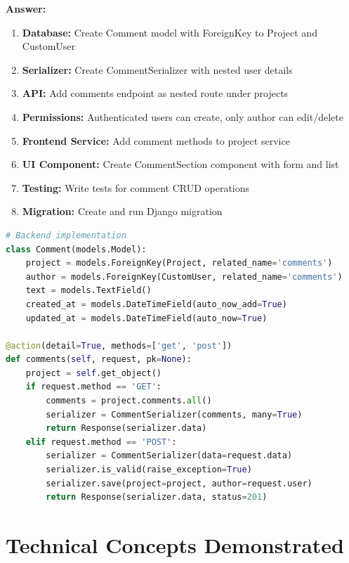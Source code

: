 \documentclass[11pt,a4paper]{article}
\begin{document}
\textbf{Answer:}
\begin{enumerate}[leftmargin=*]
    \item \textbf{Database:} Create Comment model with ForeignKey to Project and CustomUser
    \item \textbf{Serializer:} Create CommentSerializer with nested user details
    \item \textbf{API:} Add comments endpoint as nested route under projects
    \item \textbf{Permissions:} Authenticated users can create, only author can edit/delete
    \item \textbf{Frontend Service:} Add comment methods to project service
    \item \textbf{UI Component:} Create CommentSection component with form and list
    \item \textbf{Testing:} Write tests for comment CRUD operations
    \item \textbf{Migration:} Create and run Django migration
\end{enumerate}

\begin{lstlisting}[language=Python]
# Backend implementation
class Comment(models.Model):
    project = models.ForeignKey(Project, related_name='comments')
    author = models.ForeignKey(CustomUser, related_name='comments')
    text = models.TextField()
    created_at = models.DateTimeField(auto_now_add=True)
    updated_at = models.DateTimeField(auto_now=True)

@action(detail=True, methods=['get', 'post'])
def comments(self, request, pk=None):
    project = self.get_object()
    if request.method == 'GET':
        comments = project.comments.all()
        serializer = CommentSerializer(comments, many=True)
        return Response(serializer.data)
    elif request.method == 'POST':
        serializer = CommentSerializer(data=request.data)
        serializer.is_valid(raise_exception=True)
        serializer.save(project=project, author=request.user)
        return Response(serializer.data, status=201)
\end{lstlisting}

\section{Technical Concepts Demonstrated}
\end{document}

